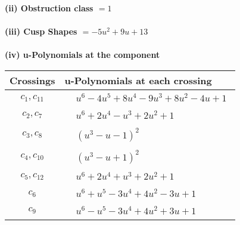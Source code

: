 \documentclass[1p]{elsarticle_modified}
\theoremstyle{definition}
\begin{document}
\flushleft \textbf{(ii) Obstruction class $= 1$}\\~\\
\flushleft \textbf{(iii) Cusp Shapes $= -5 u^2+9 u+13$}\\~\\
\newpage\renewcommand{\arraystretch}{1}
\flushleft \textbf{(iv) u-Polynomials at the component}\newline \\
\begin{tabular}{m{50pt}|m{274pt}}
Crossings & \hspace{64pt}u-Polynomials at each crossing \\
\hline $$\begin{aligned}c_{1},c_{11}\end{aligned}$$&$\begin{aligned}
&u^6-4 u^5+8 u^4-9 u^3+8 u^2-4 u+1
\end{aligned}$\\
\hline $$\begin{aligned}c_{2},c_{7}\end{aligned}$$&$\begin{aligned}
&u^6+2 u^4- u^3+2 u^2+1
\end{aligned}$\\
\hline $$\begin{aligned}c_{3},c_{8}\end{aligned}$$&$\begin{aligned}
&(u^3- u-1)^2
\end{aligned}$\\
\hline $$\begin{aligned}c_{4},c_{10}\end{aligned}$$&$\begin{aligned}
&(u^3- u+1)^2
\end{aligned}$\\
\hline $$\begin{aligned}c_{5},c_{12}\end{aligned}$$&$\begin{aligned}
&u^6+2 u^4+u^3+2 u^2+1
\end{aligned}$\\
\hline $$\begin{aligned}c_{6}\end{aligned}$$&$\begin{aligned}
&u^6+u^5-3 u^4+4 u^2-3 u+1
\end{aligned}$\\
\hline $$\begin{aligned}c_{9}\end{aligned}$$&$\begin{aligned}
&u^6- u^5-3 u^4+4 u^2+3 u+1
\end{aligned}$\\
\hline
\end{tabular}\\~\\
\end{document}
